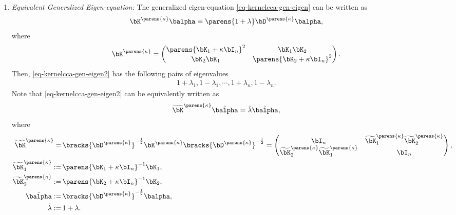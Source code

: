 \documentclass[12pt]{article}
\begin{document}
\begin{enumerate}[label=\textbf{\arabic*.}]
\begin{enumerate}
		\item \textit{Equivalent Generalized Eigen-equation:} The generalized eigen-equation \eqref{eq-kernelcca-gen-eigen} can be written as 
		\begin{align}\label{eq-kernelcca-gen-eigen2}
			\bK^{\parens{\kappa}} \balpha = \parens{1 + \lambda} \bD^{\parens{\kappa}} \balpha, 
		\end{align}
		where 
		\begin{align*}
			\bK^{\parens{\kappa}} = \begin{pmatrix}
				\parens{\bK_1 + \kappa \bI_n}^2 & \bK_1 \bK_2 \\ 
				\bK_2 \bK_1 & \parens{\bK_2 + \kappa \bI_n}^2
			\end{pmatrix}. 
		\end{align*}
		Then, \eqref{eq-kernelcca-gen-eigen2} has the following pairs of eigenvalues 
		\begin{align*}
			1 + \lambda_1, 1 - \lambda_1, \cdots, 1 + \lambda_n, 1 - \lambda_n. 
		\end{align*}
		Note that \eqref{eq-kernelcca-gen-eigen2} can be equivalently written as 
		\begin{align*}
			\widetilde{\bK}^{\parens{\kappa}} \tilde{\balpha} = \tilde{\lambda} \tilde{\balpha}, 
		\end{align*}
		where 
		\begin{align*}
			\widetilde{\bK}^{\parens{\kappa}} = & \, \bracks{\bD^{\parens{\kappa}}}^{-\frac{1}{2}} \bK^{\parens{\kappa}} \bracks{\bD^{\parens{\kappa}}}^{-\frac{1}{2}} = \begin{pmatrix}
				\bI_n & \widetilde{\bK}_1^{\parens{\kappa}} \widetilde{\bK}_2^{\parens{\kappa}} \\ 
				\widetilde{\bK}_2^{\parens{\kappa}} \widetilde{\bK}_1^{\parens{\kappa}} & \bI_n
			\end{pmatrix}, \\ 
			\widetilde{\bK}_1^{\parens{\kappa}} := & \, \parens{\bK_1 + \kappa \bI_n}^{-1} \bK_1, \\ 
			\widetilde{\bK}_2^{\parens{\kappa}} := & \, \parens{\bK_2 + \kappa \bI_n}^{-1} \bK_2, \\ 
			\tilde{\balpha} := & \, \bracks{\bD^{\parens{\kappa}}}^{-\frac{1}{2}} \balpha, \\ 
			\tilde{\lambda} := & \, 1 + \lambda. 
		\end{align*}
		
	\end{enumerate}	
	
\end{enumerate}


\printbibliography
\end{document}
